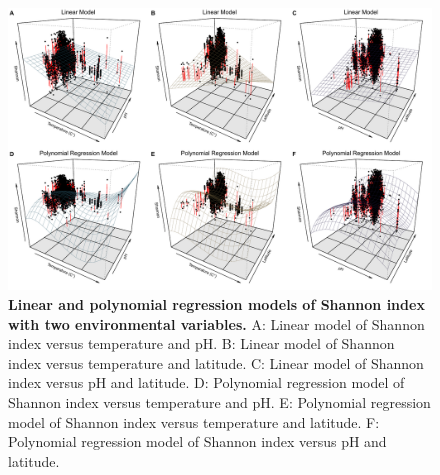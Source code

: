 \begin{figure}[H]
    \centering
    \includegraphics[scale=0.33]{./Figures/Shan_LM_PM_all_2EVs_3D}
    \caption{\textbf{Linear and polynomial regression models of Shannon index with two environmental variables.} A: Linear model of Shannon index versus temperature and pH. B: Linear model of Shannon index versus temperature and latitude. C: Linear model of Shannon index versus pH and latitude. D: Polynomial regression model of Shannon index versus temperature and pH. E: Polynomial regression model of Shannon index versus temperature and latitude. F: Polynomial regression model of Shannon index versus pH and latitude.}
    \label{fig:Shan_2EVs}
\end{figure}

